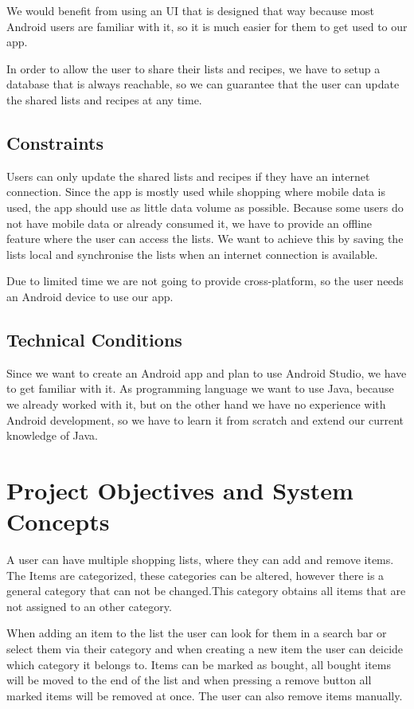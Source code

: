 \documentclass[12pt]{article}
\theoremstyle{definition}
\begin{document}
We would benefit from using an UI that is designed that way because most Android users are familiar with it, so it is much easier for them to get used to our app.

In order to allow the user to share their lists and recipes, we have to setup a database that is always reachable, so we can guarantee that the user can update the shared lists and recipes at any time.

\subsection{Constraints}
Users can only update the shared lists and recipes if they have an internet connection. Since the app is mostly used while shopping where mobile data is used, the app should use as little data volume as possible. Because some users do not have mobile data or already consumed it, we have to provide an offline feature where the user can access the lists. We want to achieve this by saving the lists local and synchronise the lists when an internet connection is available.

Due to limited time we are not going to provide cross-platform, so the user needs an Android device to use our app.
\subsection{Technical Conditions}
Since we want to create an Android app and plan to use Android Studio, we have to get familiar with it. As programming language we want to use Java, because we already worked with it, but on the other hand we have no experience with Android development, so we have to learn it from scratch and extend our current knowledge of Java.
\pagebreak

\section{Project Objectives and System Concepts}
A user can have multiple shopping lists, where they can add and remove items. The Items are categorized, these categories can be altered, however there is a general category that can not be changed.This category obtains all items that are not assigned to an other category.

When adding an item to the list the user can look for them in a search bar or select them via their category and when creating a new item the user can deicide which category it belongs to. Items can be marked as bought, all bought items will be moved to the end of the list and when pressing a remove button all marked items will be removed at once. The user can also remove items manually.
\end{document}
